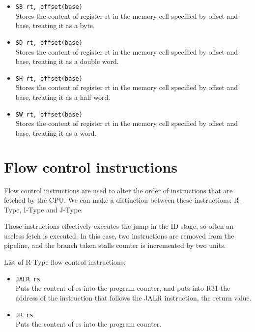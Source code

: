 \documentclass[12pt]{report}
\begin{document}
\begin{itemize}
	\item \texttt{SB rt, offset(base)}\\
	Stores the content of register rt in the memory cell specified by offset and
	base, treating it as a byte.

	\item \texttt{SD rt, offset(base)}\\
	Stores the content of register rt in the memory cell specified by offset and
	base, treating it as a double word.

	\item \texttt{SH rt, offset(base)}\\
	Stores the content of register rt in the memory cell specified by offset and
	base, treating it as a half word.

	\item \texttt{SW rt, offset(base)}\\
	Stores the content of register rt in the memory cell specified by offset and
	base, treating it as a word.
\end{itemize}

\section{Flow control instructions}
Flow control instructions are used to alter the order of instructions that are
fetched by the CPU. We can make a distinction between these instructions:
R-Type, I-Type and J-Type.

Those instructions effectively executes the jump in the ID stage, so often an
useless fetch is executed. In this case, two instructions are removed from the
pipeline, and the branch taken stalls counter is incremented by two units.

List of R-Type flow control instructions:
\begin{itemize}
	\item \texttt{JALR rs}\\
	Puts the content of rs into the program counter, and puts into R31 the
	address of the instruction that follows the JALR instruction, the return
	value.

	\item \texttt{JR rs}\\
	Puts the content of rs into the program counter.
\end{itemize}
\end{document}
